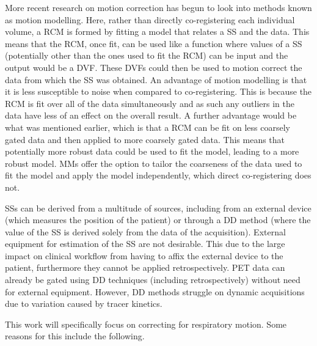         More recent research on motion correction has begun to look into methods known as motion modelling. Here, rather than directly co-registering each individual volume, a \gls{RCM} is formed by fitting a model that relates a \gls{SS} and the data. This means that the \gls{RCM}, once fit, can be used like a function where values of a \gls{SS} (potentially other than the ones used to fit the \gls{RCM}) can be input and the output would be a \gls{DVF}. These \glspl{DVF} could then be used to motion correct the data from which the \gls{SS} was obtained. An advantage of motion modelling is that it is less susceptible to noise when compared to co-registering. This is because the \gls{RCM} is fit over all of the data simultaneously and as such any outliers in the data have less of an effect on the overall result. A further advantage would be what was mentioned earlier, which is that a \gls{RCM} can be fit on less coarsely gated data and then applied to more coarsely gated data. This means that potentially more robust data could be used to fit the model, leading to a more robust model. \glspl{MM} offer the option to tailor the coarseness of the data used to fit the model and apply the model independently, which direct co-registering does not.
    
        \glspl{SS} can be derived from a multitude of sources, including from an external device (which measures the position of the patient) or through a \gls{DD} method (where the value of the \gls{SS} is derived solely from the data of the acquisition). External equipment for estimation of the \gls{SS} are not desirable. This due to the large impact on clinical workflow from having to affix the external device to the patient, furthermore they cannot be applied retrospectively. \gls{PET} data can already be gated using \gls{DD} techniques (including retrospectively) without need for external equipment. However, \gls{DD} methods struggle on dynamic acquisitions due to variation caused by tracer kinetics.%
            
        This work will specifically focus on correcting for respiratory motion. Some reasons for this include the following.
            
